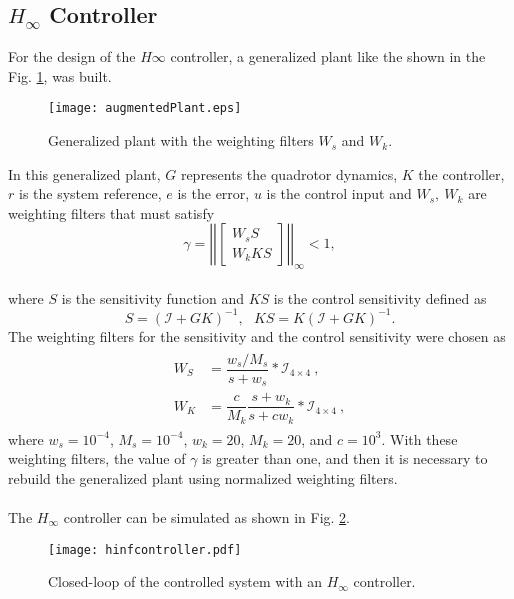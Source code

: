 \subsection{$H_\infty$ Controller}
\cite{Zhou1999}
For the design of the $H\infty$ controller, a generalized plant like the shown in the Fig. \ref{fig:augmentedPlant}, was built.
\begin{figure}[H]
	\begin{center}
	\texttt{[image: augmentedPlant.eps]}
	\caption{Generalized plant with the weighting filters $W_s$ and $W_k$.}
	\label{fig:augmentedPlant}
	\end{center}
	\end{figure}	
In this generalized plant, $G$ represents the quadrotor dynamics, $K$ the controller, $r$ is the system reference, $e$ is the error, $u$ is the control input and $W_{s},\ W_{k}$ are weighting filters that must satisfy 
	\begin{equation}\label{eqn:hinf}
	\gamma = \left|\left|\begin{bmatrix}
	W_{s}S\\W_{k}KS
	\end{bmatrix}\right|\right|_{\infty} < 1,
	\end{equation}
\\where $S$ is the sensitivity function and $KS$ is the control sensitivity defined as
	\begin{equation}
	S = (\mathcal{I} + GK)^{-1},\ \ \ KS = K(\mathcal{I} + GK)^{-1}.
	\end{equation}
The weighting filters for the sensitivity and the control sensitivity were chosen as
\begin{align}\label{eqn:wswk}
\begin{split}
W_{S} &= \dfrac{w_{s}/M_{s}}{s + w_{s}}*\mathcal{I}_{4\times4}\ ,\\
W_{K} &= \dfrac{c}{M_{k}}\dfrac{s+w_{k}}{s+cw_{k}}*\mathcal{I}_{4\times4}\ ,
\end{split}
\end{align}
where $w_{s} = 10^{-4}$, $M_{s} = 10^{-4}$, $w_{k} = 20$, $M_{k} = 20$, and $c = 10^{3}$. With these weighting filters, the value of $\gamma$ is greater than one, and then it is necessary to rebuild the generalized plant using normalized weighting filters.
\\\\The $H_{\infty}$ controller can be simulated as shown in Fig. \ref{fig:hinfcontroller}.
	\begin{figure}[h]
	\begin{center}
	\texttt{[image: hinfcontroller.pdf]}
	\caption{Closed-loop of the controlled system with an $H_{\infty}$ controller.}
	\label{fig:hinfcontroller}
	\end{center}
	\end{figure}
